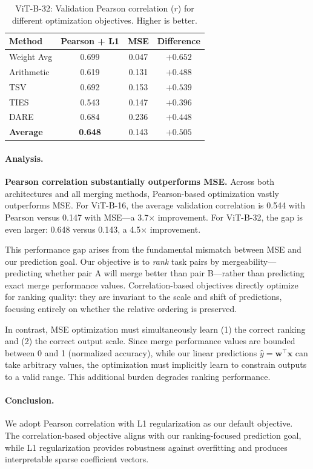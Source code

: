 \begin{table}[h]
\centering
\caption{ViT-B-32: Validation Pearson correlation ($r$) for different optimization objectives. Higher is better.}
\label{tab:objective_comparison_b32}
\begin{tabular}{@{}lccc@{}}
\toprule
\textbf{Method} & \textbf{Pearson + L1} & \textbf{MSE} & \textbf{Difference} \\
\midrule
Weight Avg & 0.699 & 0.047 & $+0.652$ \\
Arithmetic & 0.619 & 0.131 & $+0.488$ \\
TSV & 0.692 & 0.153 & $+0.539$ \\
TIES & 0.543 & 0.147 & $+0.396$ \\
DARE & 0.684 & 0.236 & $+0.448$ \\
\midrule
\textbf{Average} & \textbf{0.648} & 0.143 & $+0.505$ \\
\bottomrule
\end{tabular}
\end{table}

\paragraph{Analysis.}

\textbf{Pearson correlation substantially outperforms MSE.} Across both architectures and all merging methods, Pearson-based optimization vastly outperforms MSE. For ViT-B-16, the average validation correlation is 0.544 with Pearson versus 0.147 with MSE---a 3.7$\times$ improvement. For ViT-B-32, the gap is even larger: 0.648 versus 0.143, a 4.5$\times$ improvement.

This performance gap arises from the fundamental mismatch between MSE and our prediction goal. Our objective is to \emph{rank} task pairs by mergeability---predicting whether pair A will merge better than pair B---rather than predicting exact merge performance values. Correlation-based objectives directly optimize for ranking quality: they are invariant to the scale and shift of predictions, focusing entirely on whether the relative ordering is preserved.

In contrast, MSE optimization must simultaneously learn (1) the correct ranking and (2) the correct output scale. Since merge performance values are bounded between 0 and 1 (normalized accuracy), while our linear predictions $\hat{y} = \mathbf{w}^\top \mathbf{x}$ can take arbitrary values, the optimization must implicitly learn to constrain outputs to a valid range. This additional burden degrades ranking performance.

\paragraph{Conclusion.}
We adopt Pearson correlation with L1 regularization as our default objective. The correlation-based objective aligns with our ranking-focused prediction goal, while L1 regularization provides robustness against overfitting and produces interpretable sparse coefficient vectors.
